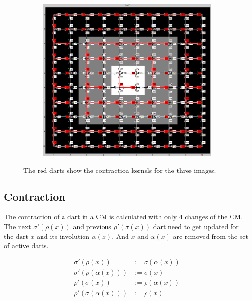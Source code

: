 \documentclass[12pt]{article}
\begin{document}
\begin{figure}[tb]
\begin{subfigure}[t]{0.3\textwidth}
      \caption{}\label{fig:dart_contract3}
    \end{subfigure}~%
    \begin{subfigure}[t]{0.3\textwidth}
      \includegraphics[width=\textwidth]{img/contract1.jpg}
      \caption{}\label{fig:dart_contract1}
    \end{subfigure}
  \caption{The red darts show the contraction kernels for the three images.}\label{fig:dart_contract}
\end{figure}


\subsection{Contraction}%
\label{sub:contraction}

The contraction of a dart in a CM is calculated with only 4 changes of the CM\@. The next \( \sigma'(\rho(x))\) and previous \( \rho'(\sigma(x))\) dart need to get updated for the dart  \( x \) and its involution \( \alpha(x) \). And  \( x \) and \( \alpha(x) \) are removed from the set of active darts.

\begin{align}
  \sigma'(\rho(x))   &:= \sigma(\alpha(x))    \\
  \sigma'(\rho(\alpha(x)))  &:= \sigma(x)     \\
  \rho'(\sigma(x))   &:= \rho(\alpha(x))      \\
  \rho'(\sigma(\alpha(x)))  &:= \rho(x)
\end{align}
\end{document}
